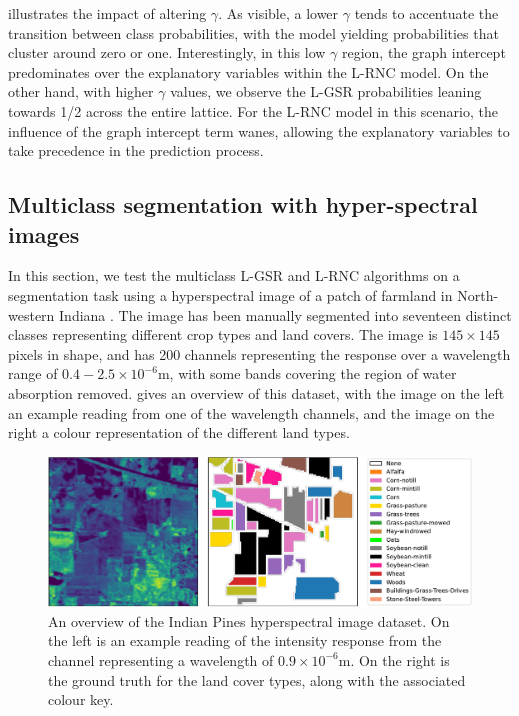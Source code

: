  illustrates the impact of altering $\gamma$. As visible, a lower $\gamma$ tends to accentuate the transition between class probabilities, with the model yielding probabilities that cluster around zero or one. Interestingly, in this low $\gamma$ region, the graph intercept predominates over the explanatory variables within the L-RNC model. On the other hand, with higher $\gamma$ values, we observe the L-GSR probabilities leaning towards 1/2 across the entire lattice. For the L-RNC model in this scenario, the influence of the graph intercept term wanes, allowing the explanatory variables to take precedence in the prediction process.


\subsection{Multiclass segmentation with hyper-spectral images}
 
In this section, we test the multiclass L-GSR and L-RNC algorithms on a segmentation task using a hyperspectral image of a patch of farmland in North-western Indiana \citep{Baumgardner2015}. The image has been manually segmented into seventeen distinct classes representing different crop types and land  covers. The image is $145 \times 145$ pixels in shape, and has 200 channels representing the response over a wavelength range of $0.4-2.5 \times 10^{-6}$m, with some bands covering the region of water absorption removed.   gives an overview of this dataset, with the image on the left an example reading from one of the wavelength channels, and the image on the right a colour representation of the different land types. 

\begin{figure}[t] 
    \begin{center}
        \includegraphics[width=\linewidth]{Figures/hyperspectral.pdf}
    \end{center}
    \caption[A visual overview of the Indian Pines hyperspectral image dataset]{An overview of the Indian Pines hyperspectral image dataset. On the left is an example reading of the intensity response from the channel representing a wavelength of $0.9 \times 10^{-6}$m. On the right is the ground truth for the land cover types, along with the associated colour key.}
    \label{fig:hyperspectral}
\end{figure}


